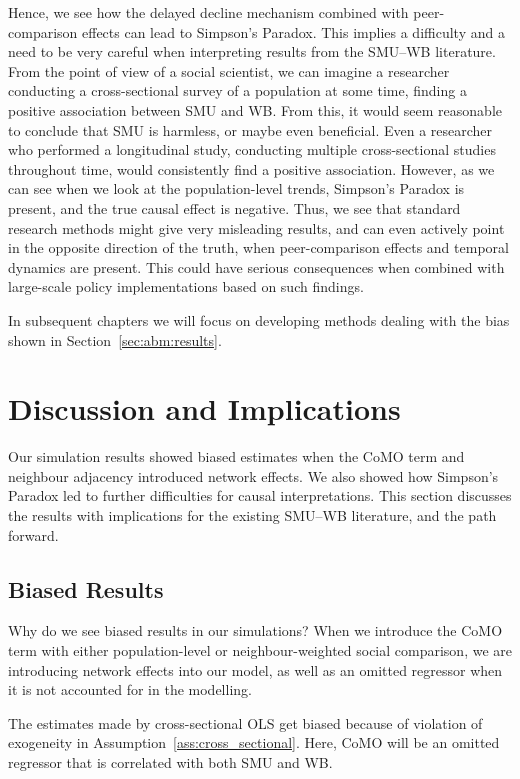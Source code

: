 Hence, we see how the delayed decline mechanism combined with peer-comparison effects can lead to Simpson's Paradox. This implies a difficulty and a need to be very careful when interpreting results from the SMU--WB literature. From the point of view of a social scientist, we can imagine a researcher conducting a cross-sectional survey of a population at some time, finding a positive association between SMU and WB\@. From this, it would seem reasonable to conclude that SMU is harmless, or maybe even beneficial. Even a researcher who performed a longitudinal study, conducting multiple cross-sectional studies throughout time, would consistently find a positive association. However, as we can see when we look at the population-level trends, Simpson's Paradox is present, and the true causal effect is negative. Thus, we see that standard research methods might give very misleading results, and can even actively point in the opposite direction of the truth, when peer-comparison effects and temporal dynamics are present. This could have serious consequences when combined with large-scale policy implementations based on such findings.

In subsequent chapters we will focus on developing methods dealing with the bias shown in Section~\ref{sec:abm:results}.

\section{Discussion and Implications}
\label{sec:abm:implications}
Our simulation results showed biased estimates when the CoMO term and neighbour adjacency introduced network effects. We also showed how Simpson's Paradox led to further difficulties for causal interpretations. This section discusses the results with implications for the existing SMU--WB literature, and the path forward.

\subsection{Biased Results}

Why do we see biased results in our simulations? When we introduce the CoMO term with either population-level or neighbour-weighted social comparison, we are introducing network effects into our model, as well as an omitted regressor when it is not accounted for in the modelling.

The estimates made by cross-sectional OLS get biased because of violation of exogeneity in Assumption~\ref{ass:cross_sectional}. Here, CoMO will be an omitted regressor that is correlated with both SMU and WB\@.

